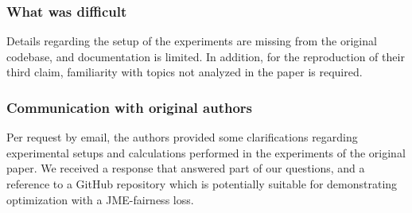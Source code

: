 \subsubsection*{What was difficult}
Details regarding the setup of the experiments are missing from the original codebase, and  documentation is limited. In addition, for the reproduction of their third claim, familiarity with topics not analyzed in the paper is required.

\subsubsection*{Communication with original authors}
Per request by email, the authors provided some clarifications regarding experimental setups and calculations performed in the experiments of the original paper. We received a response that answered part of our questions, and a reference to a GitHub repository \cite{latataro} which is potentially suitable for demonstrating optimization with a JME-fairness loss.





